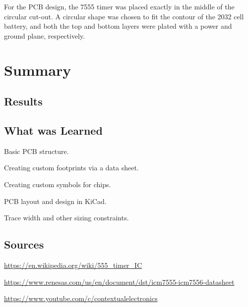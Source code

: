 \documentclass[10pt,twocolumn]{article}
\begin{document}
\noindent
For the PCB design, the 7555 timer was placed exactly in the middle of the circular cut-out. A circular shape was chosen to fit the contour of the 2032 cell battery, and both the top and bottom layers were plated with a power and ground plane, respectively.

\section{Summary}

\subsection{Results}

\subsection{What was Learned}
\begin{compactitem}
  \item Basic PCB structure.
  \item Creating custom footprints via a data sheet.
  \item Creating custom symbols for chips.
  \item PCB layout and design in KiCad.
  \item Trace width and other sizing constraints.
\end{compactitem}

\subsection{Sources}
\begin{compactitem}
  \item \url{https://en.wikipedia.org/wiki/555_timer_IC}
  \item \url{https://www.renesas.com/us/en/document/dst/icm7555-icm7556-datasheet}
  \item \url{https://www.youtube.com/c/contextualelectronics}
\end{compactitem}
\end{document}
